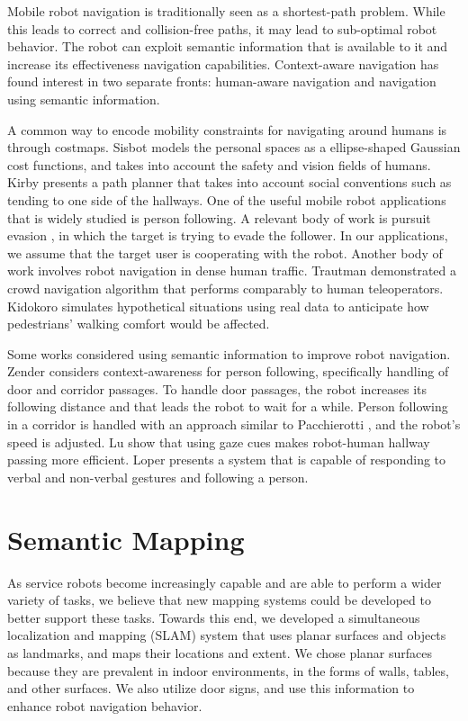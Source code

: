 \documentclass{tADR2e}
\begin{document}
Mobile robot navigation is traditionally seen as a shortest-path problem. 
While this leads to correct and collision-free paths, it may lead to sub-optimal robot behavior.
The robot can exploit semantic information that is available to it and increase its effectiveness
navigation capabilities. Context-aware navigation has found interest in two separate fronts: 
human-aware navigation and navigation using semantic information.

A common way to encode mobility constraints for navigating around humans is through costmaps. Sisbot \cite{sisbot2007human} models the
personal spaces as a ellipse-shaped Gaussian cost functions, and takes into account
the safety and vision fields of humans. Kirby \cite{kirby2009companion} presents a path planner that takes
into account social conventions such as tending to one side of the hallways. One of the useful mobile robot applications that is widely studied is person following.
A relevant body of work is pursuit evasion \cite{chung2011search}, in which the target is trying to evade the follower. In
our applications, we assume that the target user is cooperating with the robot. Another body of work involves robot navigation in dense human traffic. Trautman \cite{trautman2015robot} demonstrated a crowd navigation algorithm that performs comparably to human teleoperators. Kidokoro \cite{kidokoro2015simulation} simulates hypothetical situations using real data to anticipate how pedestrians' walking comfort would be affected.
 
Some works considered using semantic information to improve robot navigation. Zender \cite{zender2007human} considers context-awareness for person following, specifically handling of door and corridor passages. To
handle door passages, the robot increases its following distance and that leads the robot
to wait for a while. Person following in a corridor is handled with an approach similar to
Pacchierotti \cite{pacchierotti2005human}, and the robot’s speed is adjusted. Lu \cite{lu2013towards} show that using gaze cues makes 
robot-human hallway passing more efficient. Loper \cite{loper2009mobile} presents a system that
is capable of responding to verbal and non-verbal gestures and following a person. 

\section{Semantic Mapping}
\label{sec:slam_and_semantic_mapping}

As service robots become increasingly capable and are able to perform a wider
variety of tasks, we believe that new mapping systems could be developed to better
support these tasks. Towards this end, we developed a simultaneous localization
and mapping (SLAM) system that uses planar surfaces and objects as landmarks, and maps their locations and extent. We chose planar surfaces because they are prevalent in indoor environments, in the forms of walls, tables, and other surfaces.   We also utilize door signs, and use this information to enhance robot navigation behavior.
\end{document}
